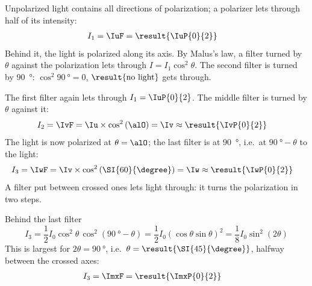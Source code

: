\begin{abcliste}
\abc Unpolarized light contains all directions of polarization; a polarizer lets through half of its intensity:
\begin{align}
 I_1 &= \IuF = \result{\IuP{0}{2}}
\end{align}
Behind it, the light is polarized along its axis. By Malus's law, a filter turned by $\theta$ against the polarization lets through $I = I_1\cos^2\theta$. The second filter is turned by \SI{90}{\degree}: $\cos^2\SI{90}{\degree} = 0$, $\result{\text{no light}}$ gets through.

\abc The first filter again lets through $I_1 = \IuP{0}{2}$. The middle filter is turned by $\theta$ against it:
\begin{align}
 I_2 &= \IvF = \Iu\times\cos^2\left(\alO\right) = \Iv \approx \result{\IvP{0}{2}}
\end{align}
The light is now polarized at $\theta = \alO$; the last filter is at \SI{90}{\degree}, i.e.\ at $\SI{90}{\degree}-\theta$ to the light:
\begin{align}
 I_3 &= \IwF = \Iv\times\cos^2\left(\SI{60}{\degree}\right) = \Iw \approx \result{\IwP{0}{2}}
\end{align}
A filter put between crossed ones lets light through: it turns the polarization in two steps.

\abc Behind the last filter
\begin{equation}
 I_3 = \frac{1}{2}I_0\cos^2\theta\,\cos^2\left(\SI{90}{\degree}-\theta\right) = \frac{1}{2}I_0\left(\cos\theta\sin\theta\right)^2 = \frac{1}{8}I_0\sin^2(2\theta)
\end{equation}
This is largest for $2\theta = \SI{90}{\degree}$, i.e.\ $\theta = \result{\SI{45}{\degree}}$, halfway between the crossed axes:
\begin{align}
 I_3 &= \ImxF = \result{\ImxP{0}{2}}
\end{align}
\end{abcliste}

